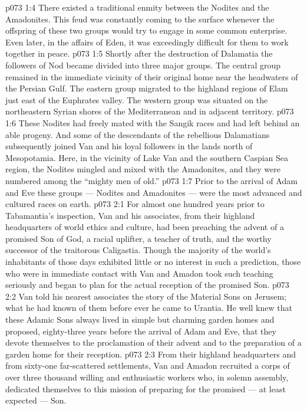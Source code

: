 \vs p073 1:4 There existed a traditional enmity between the Nodites and the Amadonites. This feud was constantly coming to the surface whenever the offspring of these two groups would try to engage in some common enterprise. Even later, in the affairs of Eden, it was exceedingly difficult for them to work together in peace.
\vs p073 1:5 Shortly after the destruction of Dalamatia the followers of Nod became divided into three major groups. The central group remained in the immediate vicinity of their original home near the headwaters of the Persian Gulf. The eastern group migrated to the highland regions of Elam just east of the Euphrates valley. The western group was situated on the northeastern Syrian shores of the Mediterranean and in adjacent territory.
\vs p073 1:6 These Nodites had freely mated with the Sangik races and had left behind an able progeny. And some of the descendants of the rebellious Dalamatians subsequently joined Van and his loyal followers in the lands north of Mesopotamia. Here, in the vicinity of Lake Van and the southern Caspian Sea region, the Nodites mingled and mixed with the Amadonites, and they were numbered among the “mighty men of old.”
\vs p073 1:7 Prior to the arrival of Adam and Eve these groups --- Nodites and Amadonites --- were the most advanced and cultured races on earth.
\vs p073 2:1 For almost one hundred years prior to Tabamantia’s inspection, Van and his associates, from their highland headquarters of world ethics and culture, had been preaching the advent of a promised Son of God, a racial uplifter, a teacher of truth, and the worthy successor of the traitorous Caligastia. Though the majority of the world’s inhabitants of those days exhibited little or no interest in such a prediction, those who were in immediate contact with Van and Amadon took such teaching seriously and began to plan for the actual reception of the promised Son.
\vs p073 2:2 Van told his nearest associates the story of the Material Sons on Jerusem; what he had known of them before ever he came to Urantia. He well knew that these Adamic Sons always lived in simple but charming garden homes and proposed, eighty\hyp{}three years before the arrival of Adam and Eve, that they devote themselves to the proclamation of their advent and to the preparation of a garden home for their reception.
\vs p073 2:3 From their highland headquarters and from sixty\hyp{}one far\hyp{}scattered settlements, Van and Amadon recruited a corps of over three thousand willing and enthusiastic workers who, in solemn assembly, dedicated themselves to this mission of preparing for the promised --- at least expected --- Son.
